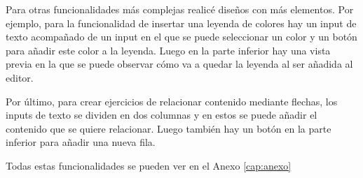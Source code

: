 Para otras funcionalidades más complejas realicé diseños con más elementos. Por ejemplo, para la funcionalidad de insertar una leyenda de colores hay un input de texto acompañado de un input en el que se puede seleccionar un color y un botón para añadir este color a la leyenda. Luego en la parte inferior hay una vista previa en la que se puede observar cómo va a quedar la leyenda al ser añadida al editor.
 
Por último, para crear ejercicios de relacionar contenido mediante flechas, los inputs de texto se dividen en dos columnas y en estos se puede añadir el contenido que se quiere relacionar. Luego también hay un botón en la parte inferior para añadir una nueva fila.
 

Todas estas funcionalidades se pueden ver en el Anexo \ref{cap:anexo}

